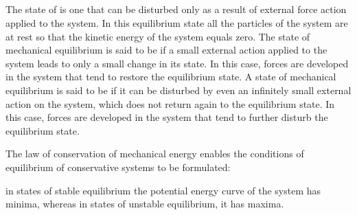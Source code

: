 \subsection{}\label{3.4.5} The state of  is one that can be disturbed only as a result of external force action applied to the system. In this equilibrium state all the particles of the system are at rest so that the kinetic energy of the system equals zero. The state of mechanical equilibrium is said to be  if a small external action applied to the system leads to only a small change in its state. In this case, forces are devel­oped in the system that tend to restore the equilibrium state. A state of mechanical equilibrium is said to be  if it can be disturbed by even an infinitely small external action on the system, which does not return again to the equilibrium state. In this case, forces are developed in the system that tend to further disturb the equilibrium state.

The law of conservation of mechanical energy enables the condi­tions of equilibrium of conservative systems to be formulated:

in states of stable equilibrium the potential energy curve of the system has minima, whereas in states of unstable equilib­rium, it has maxima.

